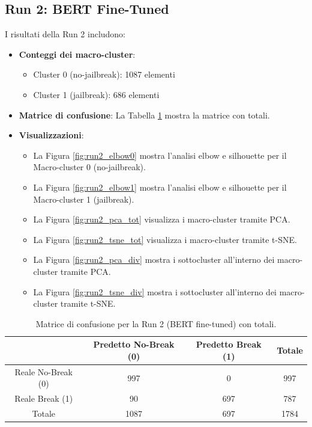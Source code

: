\documentclass[a4paper,12pt]{article}
\begin{document}
\subsection{Run 2: BERT Fine-Tuned}
I risultati della Run 2 includono:
\begin{itemize}
\item \textbf{Conteggi dei macro-cluster}:
  \begin{itemize}
  \item Cluster 0 (no-jailbreak): 1087 elementi
  \item Cluster 1 (jailbreak): 686 elementi
  \end{itemize}
\item \textbf{Matrice di confusione}: La Tabella \ref{tab:conf_run2_tot} mostra la matrice con totali.
\item \textbf{Visualizzazioni}:
  \begin{itemize}
  \item La Figura \ref{fig:run2_elbow0} mostra l'analisi elbow e silhouette per il Macro-cluster 0 (no-jailbreak).
  \item La Figura \ref{fig:run2_elbow1} mostra l'analisi elbow e silhouette per il Macro-cluster 1 (jailbreak).
  \item La Figura \ref{fig:run2_pca_tot} visualizza i macro-cluster tramite PCA.
  \item La Figura \ref{fig:run2_tsne_tot} visualizza i macro-cluster tramite t-SNE.
  \item La Figura \ref{fig:run2_pca_div} mostra i sottocluster all'interno dei macro-cluster tramite PCA.
  \item La Figura \ref{fig:run2_tsne_div} mostra i sottocluster all'interno dei macro-cluster tramite t-SNE.
  \end{itemize}
\end{itemize}

\begin{table}[h]
    \centering
    \begin{tabular}{c|cc|c}
        \toprule
        & Predetto No-Break (0) & Predetto Break (1) & Totale \\
        \midrule
        Reale No-Break (0) & 997 & 0 & 997 \\
        Reale Break (1) & 90 & 697 & 787 \\
        \midrule
        Totale & 1087 & 697 & 1784 \\
        \bottomrule
    \end{tabular}
    \caption{Matrice di confusione per la Run 2 (BERT fine-tuned) con totali.}
    \label{tab:conf_run2_tot}
\end{table}
\end{document}

